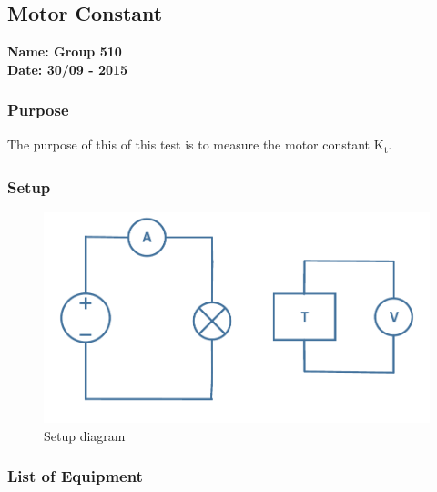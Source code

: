\pagebreak
\subsection{Motor Constant} %
\textbf{Name: Group 510}\\
\textbf{Date: 30/09 - 2015}

\subsubsection{Purpose}
The purpose of this of this test is to measure the motor constant \si{K_t}.

\subsubsection{Setup}
\begin{figure}[H]
  \centering
	\includegraphics[scale=0.5]{figures/MotorTest5.pdf}
	\caption{Setup diagram}
\end{figure}

\subsubsection{List of Equipment}

